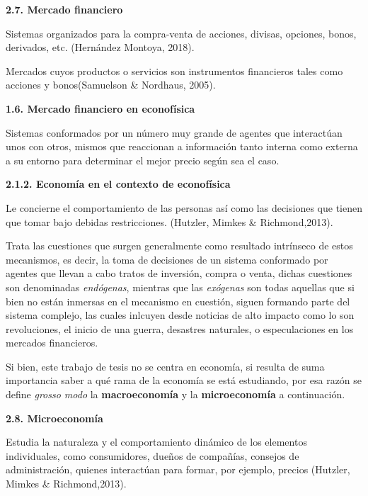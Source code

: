 {
\noindent
\Large  \textbf{2.7. Mercado financiero} 
}

Sistemas organizados para la compra-venta de acciones, divisas, opciones, bonos, derivados, etc. (Hernández Montoya, 2018).
\newline

Mercados cuyos productos o servicios son instrumentos financieros tales como acciones y bonos(Samuelson \& Nordhaus, 2005). 
\newline

{
\noindent
\Large  \textbf{1.6. Mercado financiero en econofísica} 
}

Sistemas conformados por un número muy grande de agentes que interactúan unos con otros, mismos que reaccionan a información tanto interna como externa a su entorno para determinar el mejor precio según sea el caso.
\newline

{
\noindent
\Large  \textbf{2.1.2. Economía en el contexto de econofísica} 
}

Le concierne el comportamiento de las personas así como las decisiones que tienen que tomar bajo debidas restricciones. (Hutzler, Mimkes \& Richmond,2013).
\newline


Trata las cuestiones que surgen generalmente como resultado intrínseco de estos mecanismos, es decir, la toma de decisiones de un sistema conformado por agentes que llevan a cabo tratos de inversión, compra o venta, dichas cuestiones son denominadas \textit{endógenas}, mientras que las \textit{exógenas} son todas aquellas que si bien no están inmersas en el mecanismo en cuestión, siguen formando parte del sistema complejo, las cuales inlcuyen desde noticias de alto impacto como lo son revoluciones, el inicio de una guerra, desastres naturales, o especulaciones en los mercados financieros.  
\newline

Si bien, este trabajo de tesis no se centra en economía, si resulta de suma importancia saber a qué rama de la economía se está estudiando, por esa razón se define \textit{grosso modo} la \textbf{macroeconomía} y la \textbf{microeconomía} a continuación.
\newline

{
\noindent
\Large  \textbf{2.8. Microeconomía} 
}

Estudia la naturaleza y el comportamiento dinámico de los elementos individuales, como consumidores, dueños de compañías, consejos de administración, quienes interactúan para formar, por ejemplo, precios (Hutzler, Mimkes \& Richmond,2013).
\newline

